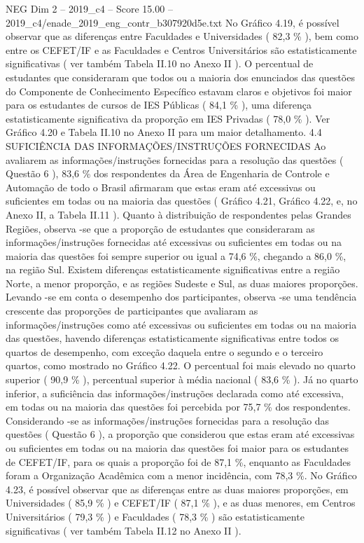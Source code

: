 \begin{textsample}{NEG Dim 2 – 2019\_c4 – Score 15.00 – 2019\_c4/enade\_2019\_eng\_contr\_b307920d5e.txt}
No Gráfico 4.19, é possível observar que as diferenças entre Faculdades e Universidades ( 82,3 \% ), bem como entre os CEFET/IF e as Faculdades e Centros Universitários são estatisticamente significativas ( ver também Tabela II.10 no Anexo II ).
O percentual de estudantes que consideraram que todos ou a maioria dos enunciados das questões do Componente de Conhecimento Específico estavam claros e objetivos foi maior para os estudantes de cursos de IES Públicas ( 84,1 \% ), uma diferença estatisticamente significativa da proporção em IES Privadas ( 78,0 \% ).
Ver Gráfico 4.20 e Tabela II.10 no Anexo II para um maior detalhamento. 4.4 SUFICIÊNCIA DAS INFORMAÇÕES/INSTRUÇÕES FORNECIDAS Ao avaliarem as informações/instruções fornecidas para a resolução das questões ( Questão 6 ), 83,6 \% dos respondentes da Área de Engenharia de Controle e Automação de todo o Brasil afirmaram que estas eram até excessivas ou suficientes em todas ou na maioria das questões ( Gráfico 4.21, Gráfico 4.22, e, no Anexo II, a Tabela II.11 ).
Quanto à distribuição de respondentes pelas Grandes Regiões, observa -se que a proporção de estudantes que consideraram as informações/instruções fornecidas até excessivas ou suficientes em todas ou na maioria das questões foi sempre superior ou igual a 74,6 \%, chegando a 86,0 \%, na região Sul.
Existem diferenças estatisticamente significativas entre a região Norte, a menor proporção, e as regiões Sudeste e Sul, as duas maiores proporções.
Levando -se em conta o desempenho dos participantes, observa -se uma tendência crescente das proporções de participantes que avaliaram as informações/instruções como até excessivas ou suficientes em todas ou na maioria das questões, havendo diferenças estatisticamente significativas entre todos os quartos de desempenho, com exceção daquela entre o segundo e o terceiro quartos, como mostrado no Gráfico 4.22.
O percentual foi mais elevado no quarto superior ( 90,9 \% ), percentual superior à média nacional ( 83,6 \% ).
Já no quarto inferior, a suficiência das informações/instruções declarada como até excessiva, em todas ou na maioria das questões foi percebida por 75,7 \% dos respondentes.
Considerando -se as informações/instruções fornecidas para a resolução das questões ( Questão 6 ), a proporção que considerou que estas eram até excessivas ou suficientes em todas ou na maioria das questões foi maior para os estudantes de CEFET/IF, para os quais a proporção foi de 87,1 \%, enquanto as Faculdades foram a Organização Acadêmica com a menor incidência, com 78,3 \%.
No Gráfico 4.23, é possível observar que as diferenças entre as duas maiores proporções, em Universidades ( 85,9 \% ) e CEFET/IF ( 87,1 \% ), e as duas menores, em Centros Universitários ( 79,3 \% ) e Faculdades ( 78,3 \% ) são estatisticamente significativas ( ver também Tabela II.12 no Anexo II ).

\end{textsample}
